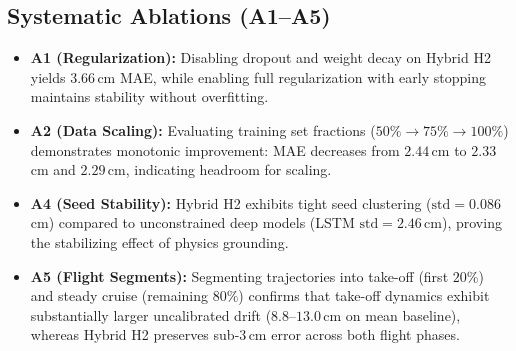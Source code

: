 \begin{table}[t]
\centering
\caption{Cross-model validation and ablation results (mean $\pm$ std over 3 seeds).}
\label{tab:ablation_experiments}
\end{table}

\subsection{Systematic Ablations (A1--A5)}
\begin{itemize}
    \item \textbf{A1 (Regularization):} Disabling dropout and weight decay on Hybrid H2 yields $3.66$\,cm MAE, while enabling full regularization with early stopping maintains stability without overfitting.
    \item \textbf{A2 (Data Scaling):} Evaluating training set fractions ($50\% \to 75\% \to 100\%$) demonstrates monotonic improvement: MAE decreases from $2.44$\,cm to $2.33$\,cm and $2.29$\,cm, indicating headroom for scaling.
    \item \textbf{A4 (Seed Stability):} Hybrid H2 exhibits tight seed clustering ($\mathrm{std} = 0.086$\,cm) compared to unconstrained deep models (LSTM $\mathrm{std} = 2.46$\,cm), proving the stabilizing effect of physics grounding.
    \item \textbf{A5 (Flight Segments):} Segmenting trajectories into take-off (first $20\%$) and steady cruise (remaining $80\%$) confirms that take-off dynamics exhibit substantially larger uncalibrated drift ($8.8$--$13.0$\,cm on mean baseline), whereas Hybrid H2 preserves sub-$3$\,cm error across both flight phases.
\end{itemize}

